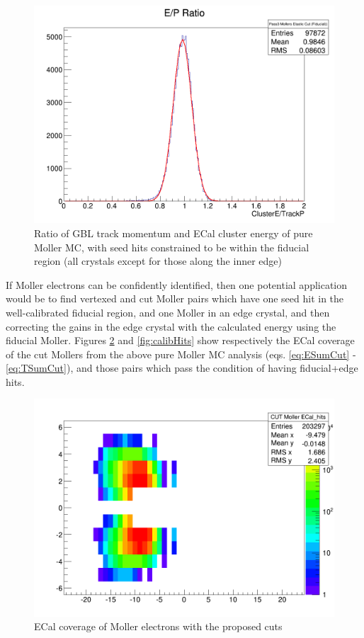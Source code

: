 \documentclass{article}
\begin{document}
	\begin{figure}[H]
  	\includegraphics[width=\linewidth]{PostCollabMeet/Pass3PureMoller/FIDUCIAL_MollerEPRatio.png}
  	\caption{Ratio of GBL track momentum and ECal cluster energy of pure Moller MC, with seed hits constrained to be within the fiducial region (all crystals except for those along the inner edge)}
  	\label{fig:EPFiducial}
	\end{figure}
	
	If Moller electrons can be confidently identified, then one potential application would be to find vertexed and cut Moller pairs which have one seed hit in the well-calibrated fiducial region, and one Moller in an edge crystal, and then correcting the gains in the edge crystal with the 	calculated energy using the fiducial Moller. Figures \ref{fig:hits} and \ref{fig:calibHits} show respectively the ECal coverage of the cut Mollers from the above pure Moller MC analysis (eqs. \ref{eq:ESumCut} - \ref{eq:TSumCut}), and those pairs which pass the condition of having fiducial+edge hits.

	\begin{figure}[H]
  	\includegraphics[width=\linewidth]{PostCollabMeet/Pass3PureMoller/CUT_ECal_hits.png}
  	\caption{ECal coverage of Moller electrons with the proposed cuts}
  	\label{fig:hits}
	\end{figure}
	
\end{document}
